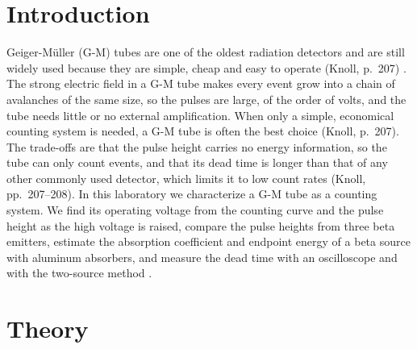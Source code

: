 \documentclass[12pt]{article}
\begin{document}
\tableofcontents

\newpage

\begin{abstract}

{}


\end{abstract}


\section{Introduction}

Geiger-M\"uller (G-M) tubes are one of the oldest radiation detectors and are still widely used because they are simple, cheap and easy to operate (Knoll, p.\ 207) \cite{knoll}. The strong electric field in a G-M tube makes every event grow into a chain of avalanches of the same size, so the pulses are large, of the order of volts, and the tube needs little or no external amplification. When only a simple, economical counting system is needed, a G-M tube is often the best choice (Knoll, p.\ 207). The trade-offs are that the pulse height carries no energy information, so the tube can only count events, and that its dead time is longer than that of any other commonly used detector, which limits it to low count rates (Knoll, pp.\ 207--208). In this laboratory we characterize a G-M tube as a counting system. We find its operating voltage from the counting curve and the pulse height as the high voltage is raised, compare the pulse heights from three beta emitters, estimate the absorption coefficient and endpoint energy of a beta source with aluminum absorbers, and measure the dead time with an oscilloscope and with the two-source method \cite{labmanual}.


\section{Theory}


\end{document}
